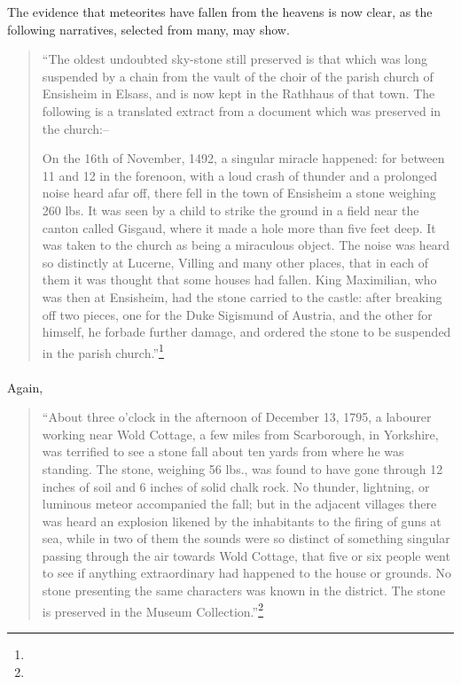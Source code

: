 \documentclass[a4paper, 12pt, oneside]{article}
\begin{document}
The evidence that meteorites have fallen from the heavens is now clear, as the following narratives, selected from many, may show.
\begin{quotation}
``The oldest undoubted sky-stone still preserved is that which was long suspended by a chain from the vault of the choir of the parish church of Ensisheim in Elsass, and is now kept in the Rathhaus of that town. The following is a translated extract from a document which was preserved in the church:--
\begin{displayquote}
On the 16th of November, 1492, a singular miracle happened: for between 11 and 12 in the forenoon, with a loud crash of thunder and a prolonged noise heard afar off, there fell in the town of Ensisheim a stone weighing 260 lbs. It was seen by a child to strike the ground in a field near the canton called Gisgaud, where it made a hole more than five feet deep. It was taken to the church as being a miraculous object. The noise was heard so distinctly at Lucerne, Villing and many other places, that in each of them it was thought that some houses had fallen. King Maximilian, who was then at Ensisheim, had the stone carried to the castle: after breaking off two pieces, one for the Duke Sigismund of Austria, and the other for himself, he forbade further damage, and ordered the stone to be suspended in the parish church.''\footnote{}
\end{displayquote}
\end{quotation}
\paragraph{}
Again,
\begin{quotation}
``About three o'clock in the afternoon of December 13, 1795, a labourer working near Wold Cottage, a few miles from Scarborough, in Yorkshire, was terrified to see a stone fall about ten yards from where he was standing. The stone, weighing 56 lbs., was found to have gone through 12 inches of soil and 6 inches of solid chalk rock. No thunder, lightning, or luminous meteor accompanied the fall; but in the adjacent villages there was heard an explosion likened by the inhabitants to the firing of guns at sea, while in two of them the sounds were so distinct of something singular passing through the air towards Wold Cottage, that five or six people went to see if anything extraordinary had happened to the house or grounds. No stone presenting the same characters was known in the district. The stone is preserved in the Museum Collection.''\footnote{}
\end{quotation}
\end{document}

